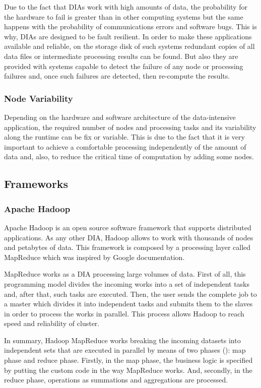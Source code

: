 Due to the fact that DIAs work with high amounts of data, the probability for the hardware to fail is greater than in other computing systems but the same happens with the probability of communications errors and software bugs. This is why, DIAs are designed to be fault resilient. In order to make these applications available and reliable, on the storage disk of such systems redundant copies of all data files or intermediate processing results can be found. But also they are provided with systems capable to detect the failure of any node or processing failures and, once such failures are detected, then re-compute the results.

\subsubsection*{Node Variability}

Depending on the hardware and software architecture of the data-intensive application, the required number of nodes and processing tasks and its variability along the runtime can be fix or variable. This is due to the fact that it is very important to achieve a comfortable processing independently of the amount of data and, also, to reduce the critical time of computation by adding some nodes.

\subsection{Frameworks}
\subsubsection{Apache Hadoop}

Apache Hadoop is an open source software framework that supports distributed applications. As any other DIA, Hadoop allows to work with thousands of nodes and petabytes of data. This framework is composed by a processing layer called MapReduce which was inspired by Google documentation.

MapReduce works as a DIA processing large volumes of data. First of all, this programming model divides the incoming works into a set of independent tasks and, after that, such tasks are executed. Then, the user sends the complete job to a master which divides it into independent tasks and submits them to the slaves in order to process the works in parallel. This process allows Hadoop to reach speed and reliability of cluster.

In summary, Hadoop MapReduce works breaking the incoming datasets into independent sets that are executed in parallel by means of two phases (\cite{hadoopwebsite}): map phase and reduce phase. Firstly, in the map phase, the business logic is specified by putting the custom code in the way MapReduce works. And, secondly, in the reduce phase, operations as summations and aggregations are processed.

